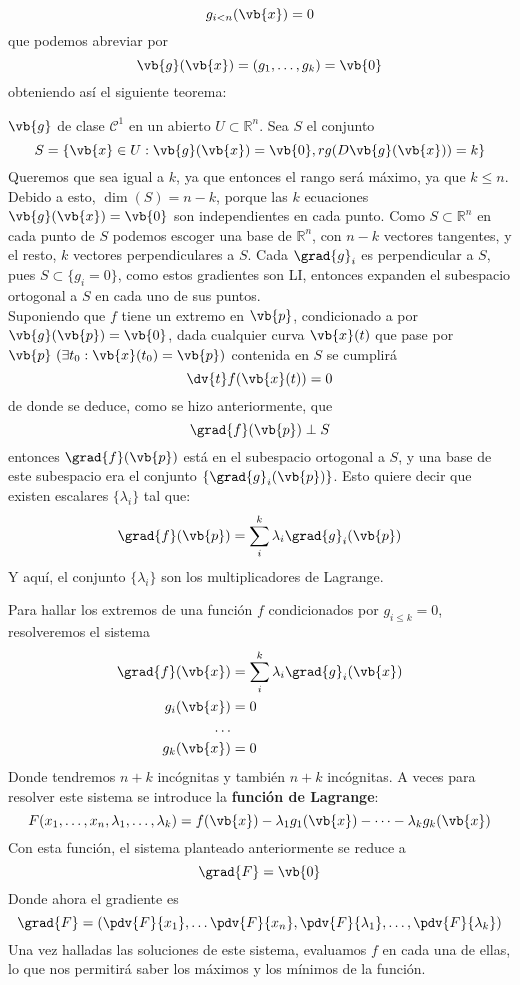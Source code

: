 \documentclass{../Calculo.tex}
\begin{document}
\[
	g_{i<n}(\vb{x}) = 0
\]
que podemos abreviar por
\[
	\vb{g}(\vb{x}) = (g_1,\dots ,g_{k}) = \vb{0}
\]
obteniendo así el siguiente teorema:
\begin{teorema}
$\vb{g}$ de clase $\mathcal{C}^{1}$ en un abierto $U \subset \mathbb{R}^{n}$. Sea $S$ el conjunto  
\[
	S = \{ \vb{x} \in U : \vb{g}(\vb{x}) = \vb{0}, rg(D\vb{g}(\vb{x})) = k\}
\]
Queremos que sea igual a $k$, ya que entonces el rango será máximo, ya que $k \leq n$. Debido a esto, $\dim (S) = n-k$, porque las $k$ ecuaciones $\vb{g}(\vb{x}) = \vb{0}$ son independientes en cada punto. Como $S \subset \mathbb{R}^{n}$ en cada punto de $S$ podemos escoger una base de $\mathbb{R}^{n}$, con $n-k$ vectores tangentes, y el resto, $k$ vectores perpendiculares a $S$. Cada $\grad{g}_{i}$ es perpendicular a $S$, pues $S \subset \{ g_{i}=0 \}$, como estos gradientes son LI, entonces expanden el subespacio ortogonal a $S$ en cada uno de sus puntos.\\
Suponiendo que $f$ tiene un extremo en $\vb{p}$, condicionado a por $\vb{g}(\vb{p}) = \vb{0}$, dada cualquier curva $\vb{x}(t)$  que pase por $\vb{p}~(\exists t_0 : \vb{x}(t_0) = \vb{p})$ contenida en $S$ se cumplirá
\[
	\dv{t}f(\vb{x}(t)) = 0
\]
de donde se deduce, como se hizo anteriormente, que
\[
	\grad{f}(\vb{p}) \perp S
\]
entonces $\grad{f}(\vb{p})$ está en el subespacio ortogonal a $S$, y una base de este subespacio era el conjunto $\{ \grad{g}_{i}(\vb{p}) \}$. Esto quiere decir que existen escalares $\{ \lambda_{i} \}$ tal que:
\[
	\grad{f}(\vb{p}) = \sum_{i}^{k} \lambda_{i} \grad{g}_{i}(\vb{p})
\]
Y aquí, el conjunto $\{ \lambda_{i} \}$ son los multiplicadores de Lagrange. 
\end{teorema}
Para hallar los extremos de una función $f$ condicionados por $g_{i\leq k} = 0$, resolveremos el sistema
\[
\]
\begin{equation}
	\begin{split}
		\grad{f}(\vb{x}) &= \sum_{i}^{k} \lambda_{i} \grad{g}_{i}(\vb{x})\\
		g_{i}(\vb{x}) &= 0\\
		\dots& \\
		g_{k}(\vb{x}) &= 0
	\end{split}
\end{equation}
Donde tendremos $n+k$ incógnitas y también $n+k$ incógnitas. A veces para resolver este sistema se introduce la \textbf{función de Lagrange}:
\[
	F(x_1,\dots ,x_{n}, \lambda_1,\dots ,\lambda_{k}) =
	f(\vb{x})-\lambda_1g_{1}(\vb{x})-\dots -\lambda_{k}g_{k}(\vb{x})
\]
Con esta función, el sistema planteado anteriormente se reduce a
\[
	\grad{F} = \vb{0}
\]
Donde ahora el gradiente es
\[
	\grad{F} = (\pdv{F}{x_1},\dots \pdv{F}{x_{n}},\pdv{F}{\lambda_1},\dots ,\pdv{F}{\lambda_{k}})
\]
Una vez halladas las soluciones de este sistema, evaluamos $f$ en cada una de ellas, lo que nos permitirá saber los máximos y los mínimos de la función. 
\end{document}
